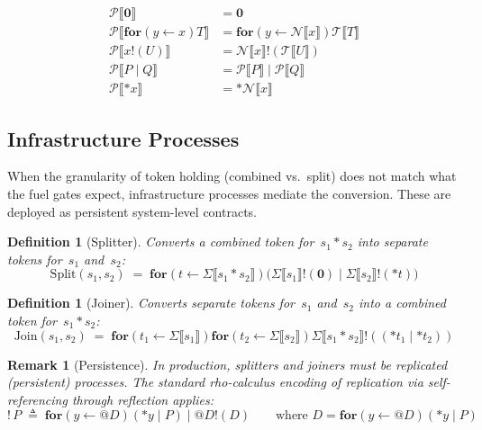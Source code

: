 \documentclass[11pt,a4paper]{article}
\makeatletter
\newtheorem{definition}[theorem]{Definition}
\newtheorem{remark}[theorem]{Remark}
\newcommand{\lsem}{\llbracket}
\newcommand{\rsem}{\rrbracket}
\newcommand{\Par}{\mathbin{|}}
\newcommand{\forc}{\mathbf{for}}
\newcommand{\send}[2]{#1 !\!\left( #2 \right)}
\newcommand{\recv}[3]{\forc\!\left( #1 \leftarrow #2 \right) #3}
\newcommand{\nil}{\mathbf{0}}
\newcommand{\drop}[1]{{\ast} #1}
\newcommand{\quot}[1]{@#1}
\newcommand{\comp}{\mathbin{*}}
\makeatother
\begin{document}
\begin{align}
  \mathcal{P}\lsem \nil \rsem
    &= \nil
    \label{eq:app-p-nil}
  \\[4pt]
  \mathcal{P}\lsem \recv{y}{x}{T} \rsem
    &= \recv{y}{\mathcal{N}\lsem x \rsem}{
        \mathcal{T}\lsem T \rsem
      }
    \label{eq:app-p-recv}
  \\[4pt]
  \mathcal{P}\lsem \send{x}{U} \rsem
    &= \send{\mathcal{N}\lsem x \rsem}{
        \mathcal{T}\lsem U \rsem
      }
    \label{eq:app-p-send}
  \\[4pt]
  \mathcal{P}\lsem P \Par Q \rsem
    &= \mathcal{P}\lsem P \rsem
       \Par \mathcal{P}\lsem Q \rsem
    \label{eq:app-p-par}
  \\[4pt]
  \mathcal{P}\lsem \drop{x} \rsem
    &= \drop{\mathcal{N}\lsem x \rsem}
    \label{eq:app-p-drop}
\end{align}

\subsection{Infrastructure Processes}
\label{app:infrastructure}

When the granularity of token holding (combined vs.\ split)
does not match what the fuel gates expect, infrastructure
processes mediate the conversion.  These are deployed as
persistent system-level contracts.

\begin{definition}[Splitter]
  \label{def:app-splitter}
  Converts a combined token for~$s_1 \comp s_2$ into separate
  tokens for~$s_1$ and~$s_2$:
  \[
    \mathrm{Split}(s_1, s_2)
    \;=\;
    \recv{t}{\Sigma\lsem s_1 \comp s_2 \rsem}{
      \bigl(
        \send{\Sigma\lsem s_1 \rsem}{\nil}
        \Par
        \send{\Sigma\lsem s_2 \rsem}{\drop{t}}
      \bigr)
    }
  \]
\end{definition}

\begin{definition}[Joiner]
  \label{def:app-joiner}
  Converts separate tokens for~$s_1$ and~$s_2$ into a combined
  token for~$s_1 \comp s_2$:
  \[
    \mathrm{Join}(s_1, s_2)
    \;=\;
    \recv{t_1}{\Sigma\lsem s_1 \rsem}{
      \recv{t_2}{\Sigma\lsem s_2 \rsem}{
        \send{\Sigma\lsem s_1 \comp s_2 \rsem}{
          (\drop{t_1} \Par \drop{t_2})
        }
      }
    }
  \]
\end{definition}

\begin{remark}[Persistence]
  In production, splitters and joiners must be
  \emph{replicated} (persistent) processes.  The standard
  rho-calculus encoding of replication via self-referencing
  through reflection applies:
  \[
    !\,P
    \;\triangleq\;
    \recv{y}{\quot{D}}{(\drop{y} \Par P)}
    \Par
    \send{\quot{D}}{D}
    \qquad\text{where } D = \recv{y}{\quot{D}}{(\drop{y} \Par P)}
  \]
\end{remark}
\end{document}
